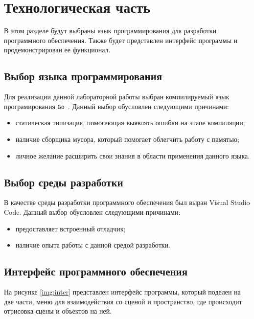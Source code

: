 \chapter{Технологическая часть}

В этом разделе будут выбраны язык программирования для разработки программного обеспечения. 
Также будет представлен интерфейс программы и продемонстрирован ее функционал.

\section{Выбор языка программирования}

Для реализации данной лабораторной работы выбран компилируемый
язык програмирования \texttt{Go}~\cite{golang}. Данный выбор обусловлен следующими причинами:

\begin{itemize}
    \item статическая типизация, помогающая выявлять ошибки на этапе компиляции;
    \item наличие сборщика мусора, который помогает облегчить работу с памятью;
    \item личное желание расширить свои знания в области применения данного языка.
\end{itemize}

\section{Выбор среды разработки}

В качестве среды разработки программного обеспечения был выран Visual Studio Code.
Данный выбор обусловлен следующими причинами: 
\begin{itemize}
    \item предоставляет встроенный отладчик;
    \item наличие опыта работы с данной средой разработки.
\end{itemize}

\section{Интерфейс программного обеспечения}

На рисунке \ref{img:inter} представлен интерфейс программы, который поделен на две части, меню для взаимодействия со сценой и пространство, 
где происходит отрисовка сцены и объектов на ней.

